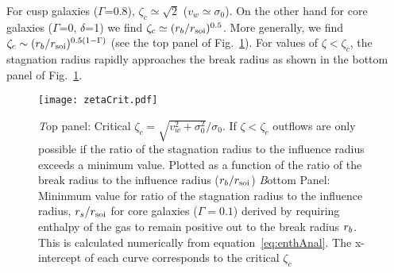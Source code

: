 For cusp galaxies ($\Gamma$=0.8), $\zeta_c\simeq \sqrt 2$
($v_w\simeq\sigma_0$).  On the other hand for core galaxies
($\Gamma$=0, $\delta$=1) we find $\zeta_c\simeq
(r_b/r_{\rm soi})^{0.5}$. More generally, we find $\zeta_c\sim
(r_b/r_{\rm soi})^{0.5(1-\Gamma)}$ (see the top panel of
Fig.~\ref{fig:zetaCrit}).  For values of $\zeta<\zeta_c$, the
stagnation radius rapidly approaches the break radius as shown in the
bottom panel of Fig.~\ref{fig:zetaCrit}.



\begin{figure}
\texttt{[image: zetaCrit.pdf]}
\caption{\label{fig:zetaCrit} {\emph Top panel:} Critical
  $\zeta_c=\sqrt{v_w^2+\sigma_0^2}/\sigma_0$. If $\zeta<\zeta_c$ outflows are
  only possible if the ratio of the stagnation radius to the influence
  radius exceeds a minimum value. Plotted as a function of the ratio
  of the break radius to the influence radius ($r_b/r_{\rm soi}$) {\emph Bottom
    Panel:} Mininmum value for ratio of the stagnation radius to the
  influence radius, $r_s/r_{\rm soi}$ for core galaxies ($\Gamma=0.1$)
  derived by requiring enthalpy of the gas to remain positive out to
  the break radius $r_b$. This is calculated numerically from
  equation~\eqref{eq:enthAnal}. The x-intercept of each curve
  corresponds to the critical $\zeta_c$}
\end{figure}


